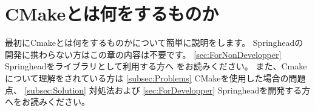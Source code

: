 \newpage
\section{CMakeとは何をするものか}
\label{sec:WhatCMakeWillDo}

\noindent
最初にCmakeとは何をするものかについて簡単に説明をします。
Springheadの開発に携わらない方はこの章の内容は不要です。
\KQuoteS \ref{sec:ForNonDevelopper} Springheadをライブラリとして利用する方へ\KQuoteE
をお読みください。
また、Cmakeについて理解をされている方は
\KQuoteS \ref{subsec:Problems} CMakeを使用した場合の問題点\KQuoteE、
\KQuoteS \ref{subsec:Solution} 対処法\KQuoteE および
\KQuoteS \ref{sec:ForDevelopper} Springheadを開発する方へ\KQuoteE をお読みください。

